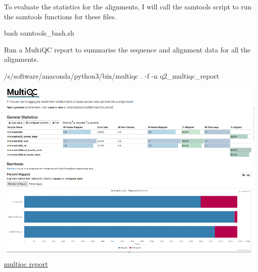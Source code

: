 \documentclass[12pt,]{article}
\newenvironment{Shaded}{\begin{snugshade}}{\end{snugshade}}
\newcommand{\FunctionTok}[1]{\textcolor[rgb]{0.00,0.00,0.00}{#1}}
\newcommand{\VariableTok}[1]{\textcolor[rgb]{0.00,0.00,0.00}{#1}}
\newcommand{\OperatorTok}[1]{\textcolor[rgb]{0.81,0.36,0.00}{\textbf{#1}}}
\newcommand{\BuiltInTok}[1]{#1}
\newcommand{\ExtensionTok}[1]{#1}
\newcommand{\NormalTok}[1]{#1}
\begin{document}
\begin{Shaded}
\end{Shaded}

To evaluate the statistics for the alignments, I will call the samtools
script to run the samtools functions for these files.

\begin{Shaded}
\begin{Highlighting}[]
\FunctionTok{bash}\NormalTok{ samtools_bash.sh}
\end{Highlighting}
\end{Shaded}

Run a MultiQC report to summarise the sequence and alignment data for
all the alignments.

\begin{Shaded}
\begin{Highlighting}[]
\ExtensionTok{/s/software/anaconda/python3/bin/multiqc}\NormalTok{ . -f -n q2_multiqc_report}
\end{Highlighting}
\end{Shaded}

\includegraphics{Multiqc_report_q2.png}\\
\href{/d/projects/u/sj003/results_cw1/q2_multiqc_report.html}{multiqc
report}
\end{document}
